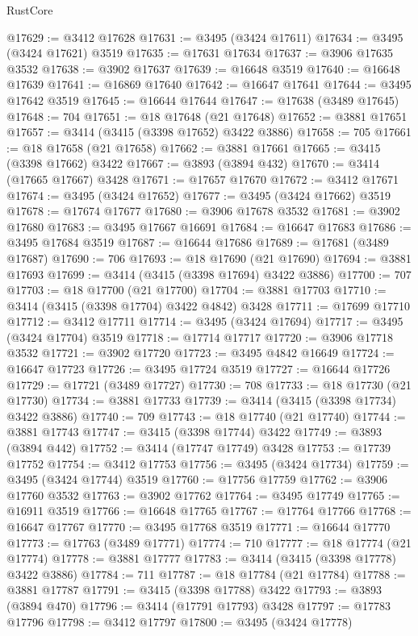 \begin{lexlean}{RustCore}
\begin{coremodule}
@17629 := @3412 @17628
@17631 := @3495 (@3424 @17611)
@17634 := @3495 (@3424 @17621) @3519
@17635 := @17631 @17634
@17637 := @3906 @17635 @3532
@17638 := @3902 @17637
@17639 := @16648 @3519
@17640 := @16648 @17639
@17641 := @16869 @17640
@17642 := @16647 @17641
@17644 := @3495 @17642 @3519
@17645 := @16644 @17644
@17647 := @17638 (@3489 @17645)
@17648 := 704
@17651 := @18 @17648 (@21 @17648)
@17652 := @3881 @17651
@17657 := @3414 (@3415 (@3398 @17652) @3422 @3886)
@17658 := 705
@17661 := @18 @17658 (@21 @17658)
@17662 := @3881 @17661
@17665 := @3415 (@3398 @17662) @3422
@17667 := @3893 (@3894 @432)
@17670 := @3414 (@17665 @17667) @3428
@17671 := @17657 @17670
@17672 := @3412 @17671
@17674 := @3495 (@3424 @17652)
@17677 := @3495 (@3424 @17662) @3519
@17678 := @17674 @17677
@17680 := @3906 @17678 @3532
@17681 := @3902 @17680
@17683 := @3495 @17667 @16691
@17684 := @16647 @17683
@17686 := @3495 @17684 @3519
@17687 := @16644 @17686
@17689 := @17681 (@3489 @17687)
@17690 := 706
@17693 := @18 @17690 (@21 @17690)
@17694 := @3881 @17693
@17699 := @3414 (@3415 (@3398 @17694) @3422 @3886)
@17700 := 707
@17703 := @18 @17700 (@21 @17700)
@17704 := @3881 @17703
@17710 := @3414 (@3415 (@3398 @17704) @3422 @4842) @3428
@17711 := @17699 @17710
@17712 := @3412 @17711
@17714 := @3495 (@3424 @17694)
@17717 := @3495 (@3424 @17704) @3519
@17718 := @17714 @17717
@17720 := @3906 @17718 @3532
@17721 := @3902 @17720
@17723 := @3495 @4842 @16649
@17724 := @16647 @17723
@17726 := @3495 @17724 @3519
@17727 := @16644 @17726
@17729 := @17721 (@3489 @17727)
@17730 := 708
@17733 := @18 @17730 (@21 @17730)
@17734 := @3881 @17733
@17739 := @3414 (@3415 (@3398 @17734) @3422 @3886)
@17740 := 709
@17743 := @18 @17740 (@21 @17740)
@17744 := @3881 @17743
@17747 := @3415 (@3398 @17744) @3422
@17749 := @3893 (@3894 @442)
@17752 := @3414 (@17747 @17749) @3428
@17753 := @17739 @17752
@17754 := @3412 @17753
@17756 := @3495 (@3424 @17734)
@17759 := @3495 (@3424 @17744) @3519
@17760 := @17756 @17759
@17762 := @3906 @17760 @3532
@17763 := @3902 @17762
@17764 := @3495 @17749
@17765 := @16911 @3519
@17766 := @16648 @17765
@17767 := @17764 @17766
@17768 := @16647 @17767
@17770 := @3495 @17768 @3519
@17771 := @16644 @17770
@17773 := @17763 (@3489 @17771)
@17774 := 710
@17777 := @18 @17774 (@21 @17774)
@17778 := @3881 @17777
@17783 := @3414 (@3415 (@3398 @17778) @3422 @3886)
@17784 := 711
@17787 := @18 @17784 (@21 @17784)
@17788 := @3881 @17787
@17791 := @3415 (@3398 @17788) @3422
@17793 := @3893 (@3894 @470)
@17796 := @3414 (@17791 @17793) @3428
@17797 := @17783 @17796
@17798 := @3412 @17797
@17800 := @3495 (@3424 @17778)

\end{coremodule}
\end{lexlean}
